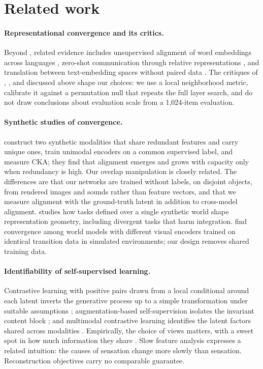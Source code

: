 \documentclass[11pt]{article}
\begin{document}
\section{Related work}

\paragraph{Representational convergence and its critics.} Beyond \citet{huh2024platonic}, related evidence includes unsupervised alignment of word embeddings across languages \citep{conneau2018word}, zero-shot communication through relative representations \citep{moschella2023relative}, and translation between text-embedding spaces without paired data \citep{jha2025vec2vec}. The critiques of \citet{koepke2026cave}, \citet{groger2026aristotelian}, and \citet{you2026structure} discussed above shape our choices: we use a local neighborhood metric, calibrate it against a permutation null that repeats the full layer search, and do not draw conclusions about evaluation scale from a 1{,}024-item evaluation.

\paragraph{Synthetic studies of convergence.} \citet{tjandrasuwita2025emergence} construct two synthetic modalities that share redundant features and carry unique ones, train unimodal encoders on a common supervised label, and measure CKA; they find that alignment emerges and grows with capacity only when redundancy is high. Our overlap manipulation is closely related. The differences are that our networks are trained without labels, on disjoint objects, from rendered images and sounds rather than feature vectors, and that we measure alignment with the ground-truth latent in addition to cross-model alignment. \citet{park2026convergent} studies how tasks defined over a single synthetic world shape representation geometry, including divergent tasks that harm integration. \citet{li2026worldmodels} find convergence among world models with different visual encoders trained on identical transition data in simulated environments; our design removes shared training data.

\paragraph{Identifiability of self-supervised learning.} Contrastive learning with positive pairs drawn from a local conditional around each latent inverts the generative process up to a simple transformation under suitable assumptions \citep{zimmermann2021contrastive}; augmentation-based self-supervision isolates the invariant content block \citep{vonkugelgen2021self}; and multimodal contrastive learning identifies the latent factors shared across modalities \citep{daunhawer2023identifiability}. Empirically, the choice of views matters, with a sweet spot in how much information they share \citep{tian2020views}. Slow feature analysis \citep{wiskott2002slow} expresses a related intuition: the causes of sensation change more slowly than sensation. Reconstruction objectives carry no comparable guarantee.
\end{document}

